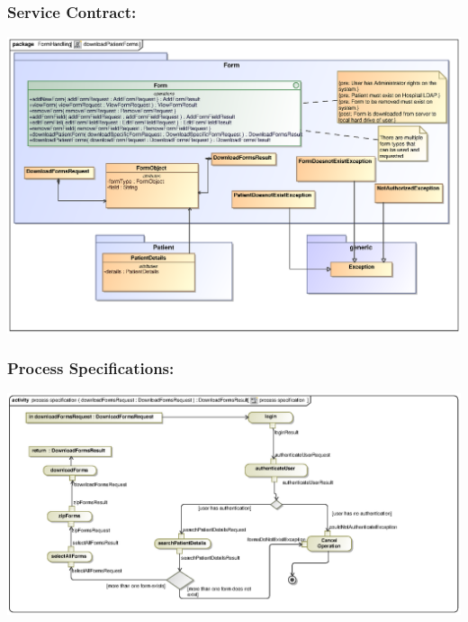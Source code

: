 \subsubsection{Service Contract:} 
\includegraphics[width=1\linewidth]{./Graphics/FormUseCaseDiagrams/downloadPatientForms}
\subsubsection{Process Specifications:} 
\includegraphics[width=1\linewidth]{./Graphics/FormUseCaseDiagrams/processspecification_DownloadForms}





